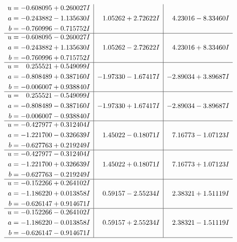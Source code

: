 \documentclass[1p]{elsarticle_modified}
\theoremstyle{definition}
\begin{document}
$$\begin{array}{c|c|c}
\begin{aligned}
u &= -0.608095 + 0.260027 I \\
a &= -0.243882 - 1.135630 I \\
b &= -0.760996 - 0.715752 I\end{aligned}
 & \phantom{-}1.05262 + 2.72622 I & \phantom{-}4.23016 - 8.33460 I \\ \hline\begin{aligned}
u &= -0.608095 - 0.260027 I \\
a &= -0.243882 + 1.135630 I \\
b &= -0.760996 + 0.715752 I\end{aligned}
 & \phantom{-}1.05262 - 2.72622 I & \phantom{-}4.23016 + 8.33460 I \\ \hline\begin{aligned}
u &= \phantom{-}0.255521 + 0.549099 I \\
a &= -0.808489 + 0.387160 I \\
b &= -0.006007 + 0.938840 I\end{aligned}
 & -1.97330 - 1.67417 I & -2.89034 + 3.89687 I \\ \hline\begin{aligned}
u &= \phantom{-}0.255521 - 0.549099 I \\
a &= -0.808489 - 0.387160 I \\
b &= -0.006007 - 0.938840 I\end{aligned}
 & -1.97330 + 1.67417 I & -2.89034 - 3.89687 I \\ \hline\begin{aligned}
u &= -0.427977 + 0.312404 I \\
a &= -1.221700 - 0.326639 I \\
b &= -0.627763 + 0.219249 I\end{aligned}
 & \phantom{-}1.45022 - 0.18071 I & \phantom{-}7.16773 - 1.07123 I \\ \hline\begin{aligned}
u &= -0.427977 - 0.312404 I \\
a &= -1.221700 + 0.326639 I \\
b &= -0.627763 - 0.219249 I\end{aligned}
 & \phantom{-}1.45022 + 0.18071 I & \phantom{-}7.16773 + 1.07123 I \\ \hline\begin{aligned}
u &= -0.152266 + 0.264102 I \\
a &= -1.186220 + 0.013858 I \\
b &= -0.626147 + 0.914671 I\end{aligned}
 & \phantom{-}0.59157 - 2.55234 I & \phantom{-}2.38321 + 1.51119 I \\ \hline\begin{aligned}
u &= -0.152266 - 0.264102 I \\
a &= -1.186220 - 0.013858 I \\
b &= -0.626147 - 0.914671 I\end{aligned}
 & \phantom{-}0.59157 + 2.55234 I & \phantom{-}2.38321 - 1.51119 I\\
 \hline 
 \end{array}$$\newpage\newpage\renewcommand{\arraystretch}{1}
\end{document}

